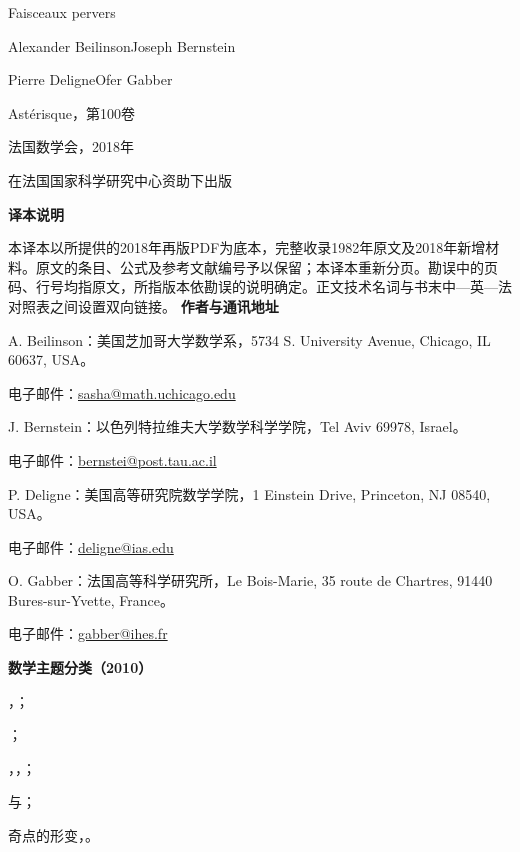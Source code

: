 \begin{center}
{\Large\sffamily\bfseries {}}\par\medskip
{\large Faisceaux pervers}\par\bigskip
Alexander Beilinson\quad Joseph Bernstein\par
Pierre Deligne\quad Ofer Gabber\par\bigskip
Astérisque，第100卷\par
法国数学会，2018年\par
在法国国家科学研究中心资助下出版
\end{center}
\vfill
\noindent\textbf{译本说明}\par
本译本以所提供的2018年再版PDF为底本，完整收录1982年原文及2018年新增材料。原文的条目、公式及参考文献编号予以保留；本译本重新分页。勘误中的页码、行号均指原文，所指版本依勘误的说明确定。正文技术名词与书末中—英—法对照表之间设置双向链接。
\clearpage
{}
\noindent\textbf{作者与通讯地址}\par
\noindent A. Beilinson：美国芝加哥大学数学系，5734 S. University Avenue, Chicago, IL 60637, USA。\par
电子邮件：\href{mailto:sasha@math.uchicago.edu}{sasha@math.uchicago.edu}
\par\medskip\noindent J. Bernstein：以色列特拉维夫大学数学科学学院，Tel Aviv 69978, Israel。\par
电子邮件：\href{mailto:bernstei@post.tau.ac.il}{bernstei@post.tau.ac.il}
\par\medskip\noindent P. Deligne：美国高等研究院数学学院，1 Einstein Drive, Princeton, NJ 08540, USA。\par
电子邮件：\href{mailto:deligne@ias.edu}{deligne@ias.edu}
\par\medskip\noindent O. Gabber：法国高等科学研究所，Le Bois-Marie, 35 route de Chartres, 91440 Bures-sur-Yvette, France。\par
电子邮件：\href{mailto:gabber@ihes.fr}{gabber@ihes.fr}
\par\bigskip\noindent\textbf{数学主题分类（2010）}
\begin{description}[leftmargin=4.4em,labelwidth=4em]
\item[{18E30}] ，；
\item[{19F27}] ；
\item[{32S60}] ，，；
\item[{55N33}] 与；
\item[{32S30}] 奇点的形变，。
\end{description}
